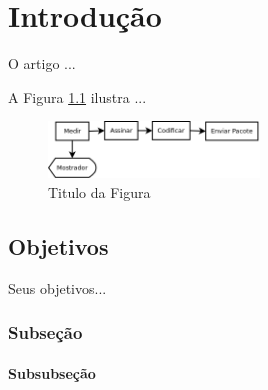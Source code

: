\OnehalfSpacing
\chapter{Introdução}

O artigo \cite{Wang2013} ...

A Figura \ref{fig:smart_meter} ilustra ...


\begin{figure}[ht]
\begin{center}
    \includegraphics[width=0.5\textwidth]{figs/smartmeter.png}
\end{center}
\caption{Titulo da Figura}
\label{fig:smart_meter}
\end{figure}

\section{Objetivos}

Seus objetivos...


\subsection{Subseção}

\lipsum[3-56]

\subsubsection{Subsubseção}

\lipsum[3-56]


\lipsum[3-56]




